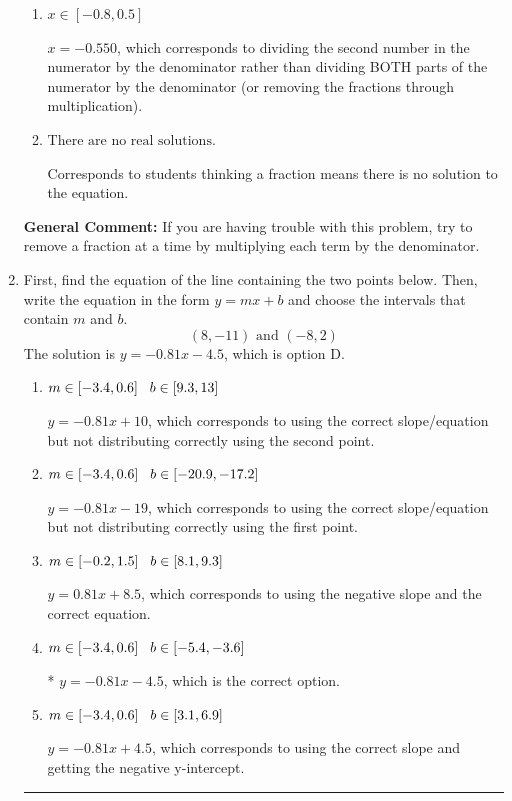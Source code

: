\documentclass{extbook}[14pt]
\newcommand{\litem}[1]{\item #1

\rule{\textwidth}{0.4pt}}
\begin{document}
\begin{enumerate}
{\begin{enumerate}[label=\Alph*.]
 $x = -3.903$, which corresponds to not distributing the negative in front of the second fraction.
\item \( x \in [-0.8, 0.5] \)

 $x = -0.550$, which corresponds to dividing the second number in the numerator by the denominator rather than dividing BOTH parts of the numerator by the denominator (or removing the fractions through multiplication).
\item \( \text{There are no real solutions.} \)

Corresponds to students thinking a fraction means there is no solution to the equation.
\end{enumerate}

\textbf{General Comment:} If you are having trouble with this problem, try to remove a fraction at a time by multiplying each term by the denominator.
}
\litem{
First, find the equation of the line containing the two points below. Then, write the equation in the form $ y=mx+b $ and choose the intervals that contain $m$ and $b$.
\[ (8, -11) \text{ and } (-8, 2) \]The solution is \( y = -0.81x -4.5 \), which is option D.\begin{enumerate}[label=\Alph*.]
\item \( m \in [-3.4, 0.6] \hspace*{3mm} b \in [9.3, 13] \)

 $y = -0.81x + 10$, which corresponds to using the correct slope/equation but not distributing correctly using the second point.
\item \( m \in [-3.4, 0.6] \hspace*{3mm} b \in [-20.9, -17.2] \)

 $y = -0.81x -19$, which corresponds to using the correct slope/equation but not distributing correctly using the first point.
\item \( m \in [-0.2, 1.5] \hspace*{3mm} b \in [8.1, 9.3] \)

 $y = 0.81x + 8.5$, which corresponds to using the negative slope and the correct equation.
\item \( m \in [-3.4, 0.6] \hspace*{3mm} b \in [-5.4, -3.6] \)

* $y = -0.81x -4.5$, which is the correct option.
\item \( m \in [-3.4, 0.6] \hspace*{3mm} b \in [3.1, 6.9] \)

 $y = -0.81x + 4.5$, which corresponds to using the correct slope and getting the negative y-intercept.
\end{enumerate}

}
\end{enumerate}
\end{document}

